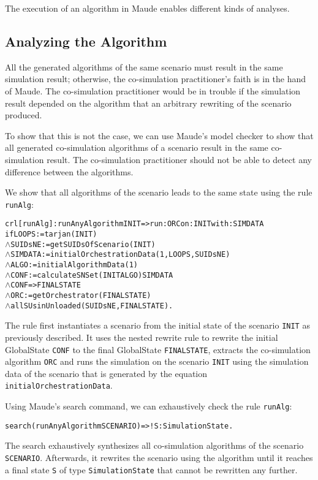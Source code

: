 The execution of an algorithm in Maude enables different kinds of analyses.

\subsection{Analyzing the Algorithm}
All the generated algorithms of the same scenario must result in the same simulation result; otherwise, the co-simulation practitioner's faith is in the hand of Maude.
The co-simulation practitioner would be in trouble if the simulation result depended on the algorithm that an arbitrary rewriting of the scenario produced.

To show that this is not the case, we can use Maude's model checker to show that all generated co-simulation algorithms of a scenario result in the same co-simulation result.
The co-simulation practitioner should not be able to detect any difference between the algorithms.

We show that all algorithms of the scenario leads to the same state using the rule \texttt{runAlg}:
\small
\begin{alltt}
crl [runAlg] : runAnyAlgorithm INIT => run: ORC on: INIT with: SIMDATA
  if LOOPS := tarjan(INIT)
  \(\land\) SUIDsNE := getSUIDsOfScenario(INIT)
  \(\land\) SIMDATA := initialOrchestrationData(1,LOOPS,SUIDsNE)
  \(\land\) ALGO := initialAlgorithmData(1)
  \(\land\) CONF := calculateSNSet(INIT ALGO) SIMDATA 
  \(\land\) {CONF} => { FINALSTATE } 
  \(\land\) ORC := getOrchestrator(FINALSTATE)
  \(\land\) allSUsinUnloaded(SUIDsNE, FINALSTATE) .
\end{alltt}
\normalsize
The rule first instantiates a scenario from the initial state of the scenario \texttt{INIT} as previously described.
It uses the nested rewrite rule to rewrite the initial GlobalState \texttt{CONF} to the final GlobalState \texttt{FINALSTATE}, extracts the co-simulation algorithm \texttt{ORC} and runs the simulation on the scenario \texttt{INIT} using the simulation data of the scenario that is generated by the equation \texttt{initialOrchestrationData}.

Using Maude's search command, we can exhaustively check the rule \texttt{runAlg}:
\small
\begin{alltt}
  search (runAnyAlgorithm SCENARIO)  =>! S:SimulationState . 
\end{alltt}
\normalsize

The search exhaustively synthesizes all co-simulation algorithms of the scenario \texttt{SCENARIO}. 
Afterwards, it rewrites the scenario using the algorithm until it reaches a final state \texttt{S} of type \texttt{SimulationState} that cannot be rewritten any further.

